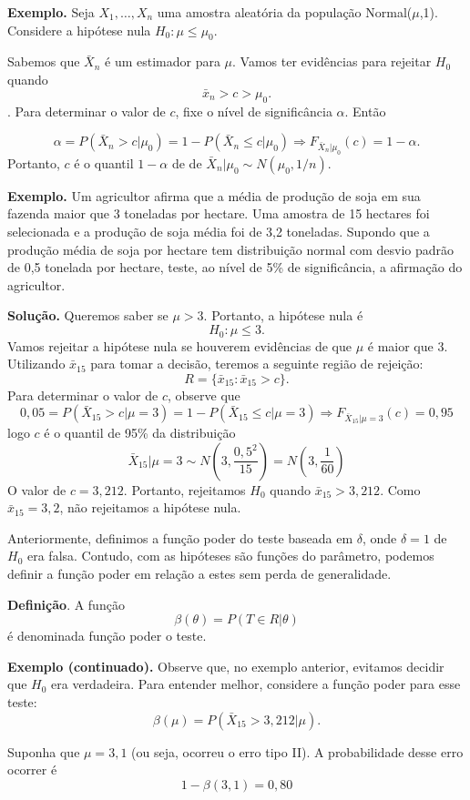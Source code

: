 \documentclass[
  letterpaper,
  DIV=11,
  numbers=noendperiod]{scrartcl}
\begin{document}
\textbf{Exemplo.} Seja \(X_1,\ldots,X_n\) uma amostra aleatória da
população Normal(\(\mu\),1). Considere a hipótese nula
\(H_0:\mu \leq \mu_0\).

Sabemos que \(\bar{X}_n\) é um estimador para \(\mu\). Vamos ter
evidências para rejeitar \(H_0\) quando \[\bar{x}_n>c>\mu_0.\]. Para
determinar o valor de \(c\), fixe o nível de significância \(\alpha\).
Então

\[\alpha=P(\bar{X}_n>c|\mu_0)=1-P(\bar{X}_n\leq c|\mu_0)\Rightarrow F_{\bar{X}_n|\mu_0}(c)=1-\alpha.\]
Portanto, \(c\) é o quantil \(1-\alpha\) de de
\(\bar{X}_n|\mu_0\sim N(\mu_0,1/n)\).

\textbf{Exemplo.} Um agricultor afirma que a média de produção de soja
em sua fazenda maior que 3 toneladas por hectare. Uma amostra de 15
hectares foi selecionada e a produção de soja média foi de 3,2
toneladas. Supondo que a produção média de soja por hectare tem
distribuição normal com desvio padrão de 0,5 tonelada por hectare,
teste, ao nível de 5\% de significância, a afirmação do agricultor.

\textbf{Solução.} Queremos saber se \(\mu>3\). Portanto, a hipótese nula
é \[H_0:\mu\leq 3.\] Vamos rejeitar a hipótese nula se houverem
evidências de que \(\mu\) é maior que 3. Utilizando \(\bar{x}_{15}\)
para tomar a decisão, teremos a seguinte região de rejeição:
\[R=\{\bar{x}_{15}:\bar{x}_{15}>c\}.\] Para determinar o valor de \(c\),
observe que
\[0,05=P(\bar{X}_{15}>c|\mu=3)=1-P(\bar{X}_{15}\leq c|\mu=3)\Rightarrow F_{\bar{X}_{15}|\mu=3}(c)=0,95\]
logo \(c\) é o quantil de 95\% da distribuição
\[\bar{X}_{15}|\mu=3\sim N\left(3,\frac{0,5^2}{15}\right)=N\left(3,\frac{1}{60}\right)\]
O valor de \(c=3,212\). Portanto, rejeitamos \(H_0\) quando
\(\bar{x}_{15}>3,212\). Como \(\bar{x}_{15}=3,2\), não rejeitamos a
hipótese nula.

Anteriormente, definimos a função poder do teste baseada em \(\delta\),
onde \(\delta=1\) de \(H_0\) era falsa. Contudo, com as hipóteses são
funções do parâmetro, podemos definir a função poder em relação a estes
sem perda de generalidade.

\textbf{Definição}. A função \[\beta(\theta)=P(T\in R|\theta)\] é
denominada função poder o teste.

\textbf{Exemplo (continuado).} Observe que, no exemplo anterior,
evitamos decidir que \(H_0\) era verdadeira. Para entender melhor,
considere a função poder para esse teste:
\[\beta(\mu)=P(\bar{X}_{15}>3,212|\mu).\]

Suponha que \(\mu=3,1\) (ou seja, ocorreu o erro tipo II). A
probabilidade desse erro ocorrer é \[1-\beta(3,1)=0,80\]
\end{document}
